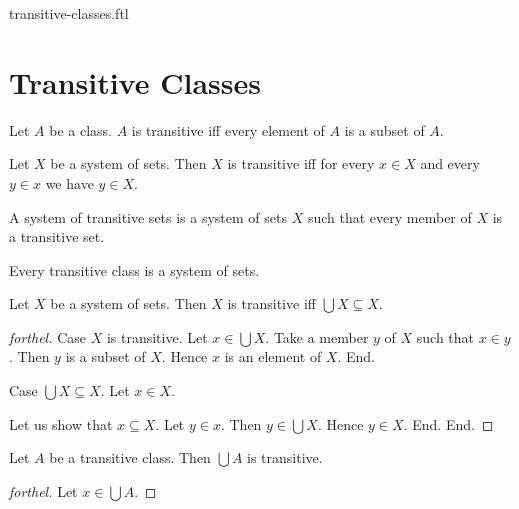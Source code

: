 \documentclass{naproche-library}
\begin{document}
\begin{smodule}{transitive-classes.ftl}

  \section*{Transitive Classes}

  \begin{definition}[forthel,id=SET_THEORY_01_8167915266244608,printid]
    Let $A$ be a class.
    $A$ is transitive iff every element of $A$ is a subset of $A$.
  \end{definition}

  \begin{proposition}[forthel,id=SET_THEORY_01_6964770955591680,printid]
    Let $X$ be a system of sets.
    Then $X$ is transitive iff for every $x \in X$ and every $y \in x$ we have $y \in X$.
  \end{proposition}

  \begin{definition}[forthel,id=SET_THEORY_01_4219967964708864,printid]
    A system of transitive sets is a system of sets $X$ such that every member of $X$ is a transitive set.
  \end{definition}

  \begin{proposition}[forthel,id=SET_THEORY_01_2095807333400576,printid]
    Every transitive class is a system of sets.
  \end{proposition}

  \begin{proposition}[forthel,id=SET_THEORY_01_6524117649981440,printid]
    Let $X$ be a system of sets.
    Then $X$ is transitive iff $\bigcup X \subseteq X$.
  \end{proposition}
  \begin{proof}[forthel]
    Case $X$ is transitive.
      Let $x \in \bigcup X$.
      Take a member $y$ of $X$ such that $x \in y$.
      Then $y$ is a subset of $X$.
      Hence $x$ is an element of $X$.
    End.

    Case $\bigcup X \subseteq X$.
      Let $x \in X$.

      Let us show that $x \subseteq X$.
        Let $y \in x$.
        Then $y \in \bigcup X$.
        Hence $y \in X$.
      End.
    End.
  \end{proof}

  \begin{proposition}[forthel,id=SET_THEORY_01_620651482185728,printid]
    Let $A$ be a transitive class.
    Then $\bigcup A$ is transitive.
  \end{proposition}
  \begin{proof}[forthel]
    Let $x \in \bigcup A$.


\end{proof}
\end{smodule}
\end{document}
